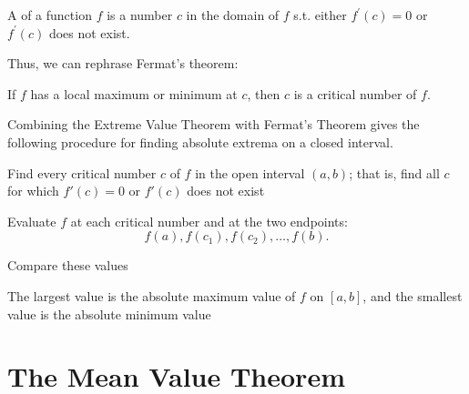 \begin{definition}
    A  of a function \(f\) is a number \(c\) in the domain of \(f\) s.t. either \(f^{\prime} (c) = 0\) or \(f^{\prime} (c)\) does not exist.  
\end{definition}

Thus, we can rephrase Fermat's theorem:

\begin{theorem}
    If \(f\) has a local maximum or minimum at \(c\), then \(c\) is a critical number of \(f\).    
\end{theorem}

Combining the Extreme Value Theorem with Fermat's Theorem gives the
following procedure for finding absolute extrema on a closed interval.

\begin{algorithm}[H]
    \caption{The Closed Interval Method}
    \label{alg:closed-interval-method}

    Find every critical number \(c\) of \(f\) in the open interval
    \((a,b)\); that is, find all \(c\) for which \(f'(c)=0\) or \(f'(c)\)
    does not exist\;

    Evaluate \(f\) at each critical number and at the two endpoints:
    \[
        f(a),f(c_1),f(c_2),\ldots,f(b).
    \]

    Compare these values\;

    The largest value is the absolute maximum value of \(f\) on
    \([a,b]\), and the smallest value is the absolute minimum value\;
\end{algorithm}

\section{The Mean Value Theorem}

